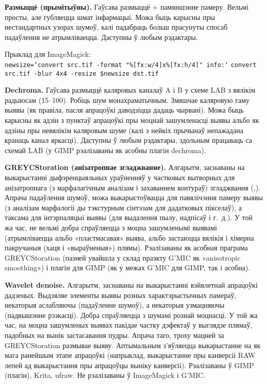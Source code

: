 \documentclass[10pt, a5paper]{article}
\def\fakeparagraph#1{\textbf{#1}}
\begin{document}
\fakeparagraph{Размыццё (прымітыўны).}
Гаўсава размыццё + памяншэнне памеру. Вельмі просты, але губляецца шмат інфармацыі. Можа быць карысны пры нестандартных узорах шумоў, калі падабраць больш прасунуты спосаб падаўлення не атрымліваецца. Даступны ў любым рэдактары.

Прыклад для {ImageMagick}:\\
\texttt{newsize=`convert src.tif -format "\%[fx:w/4]x\%[fx:h/4]" info:`}
\texttt{convert src.tif -blur 4x4 -resize \$newsize dst.tif}

\fakeparagraph{Dechroma.}
Гаўсава размыццё каляровых каналаў A і B у схеме LAB з вялікім радыюсам (15--100). Робіць шум монахраматычным. Змяшчае каляровую гаму выявы (як правіла, пасля апрацоўкі даводзіцца дадаць чырвані). Можа быць карысны як адзін з пунктаў апрацоўкі пры моцнай зашумленасці выявы альбо як адзіны пры невялікім каляровым шуме (калі з нейкіх прычынаў непажадана кранаць канал яркасці). Даступны ў любым рэдактары, здольным працаваць са схемай LAB (у {GIMP} рэалізаваны як асобны плагін {dechroma}).

\fakeparagraph{GREYCStoration (анізатропнае згладжванне).}
Алгарытм, \linebreak заснаваны на выкарыстанні дыфэренцыяльных ураўненняў у частковых вытворных для анізатропнага (з марфалагічным аналізам і захаваннем контураў) згладжвання (\cite{litvw1},\cite{litvw2}). Апрача падаўлення шумоў, можа выкарыстоўвацца для павялічэння памеру выявы (з аналізам марфалогіі ды тэкстурным сінтэзам для дадатковых пікселаў), а таксама для інтэрпаляцыі выявы (для выдалення пылу, надпісаў і г.~д.). У той жа час, не вельмі добра спраўляецца з моцна зашумленымі выявамі (атрымліваецца альбо «пластмасавая» выява, альбо застаюцца вялікія і хімерна пакручаныя (хаця і «выраўненыя») плямы).  Рэалізаваны як асобная праграма {GREYCStoration} (пазней увайшла у склад праэкту {G'MIC} як «anisotropic smoothing»)  і плагін для {GIMP} (як у межах {G'MIC для GIMP}, так і асобна).

\fakeparagraph{Wavelet denoise.}
Алгарытм, заснаваны на выкарыстанні вэйвлетнай апрацоўкі дадзеных. Выдзяляе элементы выявы розных характэрыстычных памераў, некаторыя аслабляючы (падаўленне шумоў), а некаторыя узмацняючы (падвышэнне рэзкасці).  Добра спраўляецца з шумамі рознай моцнасці. У той жа час, на моцна зашумленых выявах пакідае частку дэфектаў у выглядзе плямаў, падобных на вынік застасавання пудры. Апрача таго, троху мацней за GREYCStoration размывае выяву. Аптымальным з’яўляецца выкарыстанне на як мага ранейшым этапе апрацоўкі (напрыклад, выкарыстанне пры канверсіі RAW лепей ад выкарыстання пры апрацоўцы выніку канверсіі). Рэалізаваны ў {GIMP} (плагін), {Krita}, {ufraw}. Не рэалізаваны ў {ImageMagick} і {G'MIC}.
\end{document}
